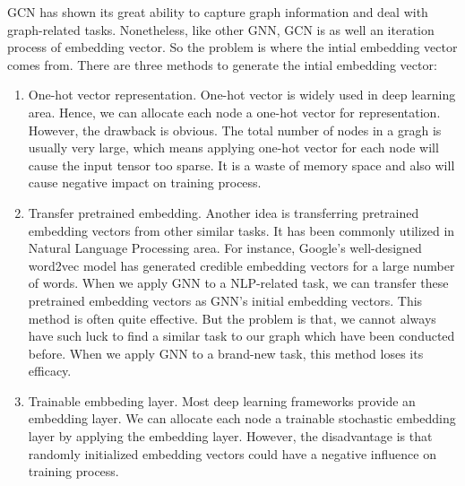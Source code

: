 \documentclass[sigconf]{acmart}
\begin{document}
GCN has shown its great ability to capture graph information and deal with graph-related tasks. Nonetheless, like other GNN, GCN is as well an iteration process of embedding vector. So the problem is where the intial embedding vector comes from. There are three methods to generate the intial embedding vector:
\begin{enumerate}
    \item One-hot vector representation. One-hot vector is widely used in deep learning area. Hence, we can allocate each node a one-hot vector for representation. However, the drawback is obvious. The total number of nodes in a gragh is usually very large, which means applying one-hot vector for each node will cause the input tensor too sparse. It is a waste of memory space and also will cause negative impact on training process.
    \item Transfer pretrained embedding. Another idea is transferring pretrained embedding vectors from other similar tasks. It has been commonly utilized in Natural Language Processing area. For instance, Google's well-designed word2vec model \cite{word2vec} has generated credible embedding vectors for a large number of words. When we apply GNN to a NLP-related task, we can transfer these pretrained embedding vectors as GNN's initial embedding vectors. This method is often quite effective. But the problem is that, we cannot always have such luck to find a similar task to our graph which have been conducted before. When we apply GNN to a brand-new task, this method loses its efficacy.
    \item Trainable embbeding layer. Most deep learning frameworks provide an embedding layer. We can allocate each node a trainable stochastic embedding layer by applying the embedding layer. However, the disadvantage is that randomly initialized embedding vectors could have a negative influence on training process.
\end{enumerate}
\end{document}
